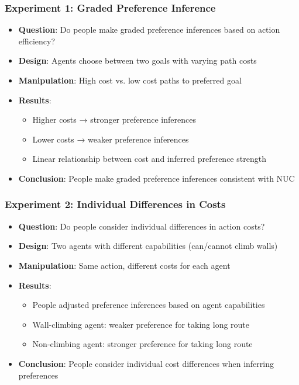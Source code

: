 \documentclass{beamer}
\begin{document}
\begin{frame}
\frametitle{Experiment 1: Graded Preference Inference}
\begin{itemize}
    \item \textbf{Question}: Do people make graded preference inferences based on action efficiency?
    \item \textbf{Design}: Agents choose between two goals with varying path costs
    \item \textbf{Manipulation}: High cost vs. low cost paths to preferred goal
    \item \textbf{Results}: 
    \begin{itemize}
        \item Higher costs → stronger preference inferences
        \item Lower costs → weaker preference inferences
        \item Linear relationship between cost and inferred preference strength
    \end{itemize}
    \item \textbf{Conclusion}: People make graded preference inferences consistent with NUC
\end{itemize}
\end{frame}

\begin{frame}
\frametitle{Experiment 2: Individual Differences in Costs}
\begin{itemize}
    \item \textbf{Question}: Do people consider individual differences in action costs?
    \item \textbf{Design}: Two agents with different capabilities (can/cannot climb walls)
    \item \textbf{Manipulation}: Same action, different costs for each agent
    \item \textbf{Results}:
    \begin{itemize}
        \item People adjusted preference inferences based on agent capabilities
        \item Wall-climbing agent: weaker preference for taking long route
        \item Non-climbing agent: stronger preference for taking long route
    \end{itemize}
    \item \textbf{Conclusion}: People consider individual cost differences when inferring preferences
\end{itemize}
\end{frame}
\end{document}
